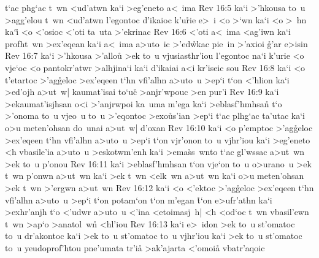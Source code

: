 t`ac
phg`ac
t~wn
<ud'atwn
ka`i
>eg'eneto
a<~ima\bibvsend
\vs Rev 16:5
ka`i
>'hkousa
to~u
>agg'elou
t~wn
<ud'atwn
l'egontoc
d'ikaioc
k'u\r{r}ie
e>~i
<o
>`wn
ka`i
<o
>~hn
ka`i\r{}
<o
<'osioc
<'oti
ta~uta
>'ekrinac\bibvsend
\vs Rev 16:6
<'oti
a<~ima
<ag'iwn
ka`i
profht~wn
>ex'eqean
ka`i
a<~ima
a>uto~ic
>'ed\r{w}kac
pie~in
>'axioi
\r{g}'ar
e>isin\bibvsend
\vs Rev 16:7
ka`i
>'hkousa
>'allou\r{}
>ek
to~u
vjusiasthr'iou
l'egontoc
na`i
k'urie
<o
vje`oc
<o
pantokr'atwr
>alhjina`i
ka`i
d'ikaiai
a<i
kr'iseic
sou\bibvsend
\vs Rev 16:8
ka`i
<o
t'etartoc
>'ag\r{g}eloc
>ex'eqeen
t`hn
vfi'alhn
a>uto~u
>ep`i
t`on
<'hlion
ka`i
>ed'ojh
a>ut~w|
kaumat'isai
to`uc\r{}
>anjr'wpouc
>en
pur'i\bibvsend
\vs Rev 16:9
ka`i
>ekaumat'isjhsan
o<i
>'anjrwpoi
ka~uma
m'ega
ka`i
>eblasf'hmhsa\r{n}
t`o
>'onoma
to~u
vjeo~u
to~u
>'eqontoc
>exo\r{u}s'ian
>ep`i
t`ac
plhg`ac
ta'utac
ka`i
o>u
meten'ohsan
do~unai
a>ut~w|
d'oxan\bibvsend
\vs Rev 16:10
ka`i
<o
p'emptoc
>'ag\r{g}eloc
>ex'eqeen
t`hn
vfi'alhn
a>uto~u
>ep`i
t`on
vjr'onon
to~u
vjhr'iou
ka`i
>eg'eneto
<h
vbasile'ia
a>uto~u
>eskotwm'enh
ka`i
>ema\r{s}s~wnto
t`ac
gl'wssac
a>ut~wn
>ek
to~u
p'onou\bibvsend
\vs Rev 16:11
ka`i
>eblasf'hmhsan
t`on
vje`on
to~u
o>urano~u
>ek
t~wn
p'onwn
a>ut~wn
ka`i
>ek
t~wn
<elk~wn
a>ut~wn
ka`i
o>u
meten'ohsan
>ek
t~wn
>'ergwn
a>ut~wn\bibvsend
\vs Rev 16:12
ka`i
<o
<'ektoc
>'ag\r{g}eloc
>ex'eqeen
t`hn
vfi'alhn
a>uto~u
>ep`i
t`on
potam`on
t`on
m'egan
\r{t}`on
e>ufr'athn
ka`i
>exhr'anjh
t`o
<'udwr
a>uto~u
<'ina
<etoimasj~h|
<h
<od`oc
t~wn
vbasil'ewn
t~wn
>ap`o
>anatol~w\r{n}
<hl'iou\bibvsend
\vs Rev 16:13
ka`i
e>~idon
>ek
to~u
st'omatoc
to~u
dr'akontoc
ka`i
>ek
to~u
st'omatoc
to~u
vjhr'iou
ka`i
>ek
to~u
st'omatoc
to~u
yeudoprof'htou
pne'umata
tr'ia\r{}
>ak'ajarta
<'omoia\r{}
vbatr'aqoic\bibvsend
